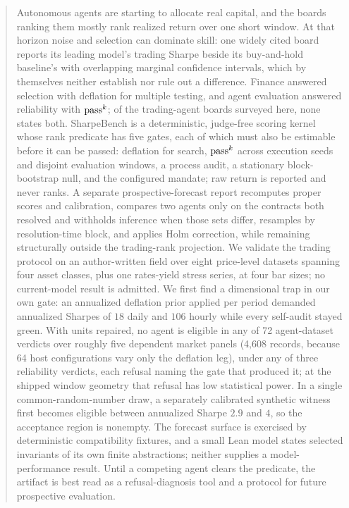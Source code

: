 \begin{abstract}
Autonomous agents are starting to allocate real capital, and the boards ranking them mostly rank realized return over one short window. At that horizon noise and selection can dominate skill: one widely cited board reports its leading model's trading Sharpe beside its buy-and-hold baseline's with overlapping marginal confidence intervals, which by themselves neither establish nor rule out a difference. Finance answered selection with deflation for multiple testing, and agent evaluation answered reliability with $\passk$; of the trading-agent boards surveyed here, none states both. SharpeBench is a deterministic, judge-free scoring kernel whose rank predicate has five gates, each of which must also be estimable before it can be passed: deflation for search, $\passk$ across execution seeds and disjoint evaluation windows, a process audit, a stationary block-bootstrap null, and the configured mandate; raw return is reported and never ranks. A separate prospective-forecast report recomputes proper scores and calibration, compares two agents only on the contracts both resolved and withholds inference when those sets differ, resamples by resolution-time block, and applies Holm correction, while remaining structurally outside the trading-rank projection. We validate the trading protocol on an author-written field over eight price-level datasets spanning four asset classes, plus one rates-yield stress series, at four bar sizes; no current-model result is admitted. We first find a dimensional trap in our own gate: an annualized deflation prior applied per period demanded annualized Sharpes of $18$ daily and $106$ hourly while every self-audit stayed green. With units repaired, no agent is eligible in any of 72 agent-dataset verdicts over roughly five dependent market panels (4{,}608 records, because 64 host configurations vary only the deflation leg), under any of three reliability verdicts, each refusal naming the gate that produced it; at the shipped window geometry that refusal has low statistical power. In a single common-random-number draw, a separately calibrated synthetic witness first becomes eligible between annualized Sharpe $2.9$ and $4$, so the acceptance region is nonempty. The forecast surface is exercised by deterministic compatibility fixtures, and a small Lean model states selected invariants of its own finite abstractions; neither supplies a model-performance result. Until a competing agent clears the predicate, the artifact is best read as a refusal-diagnosis tool and a protocol for future prospective evaluation.
\end{abstract}

